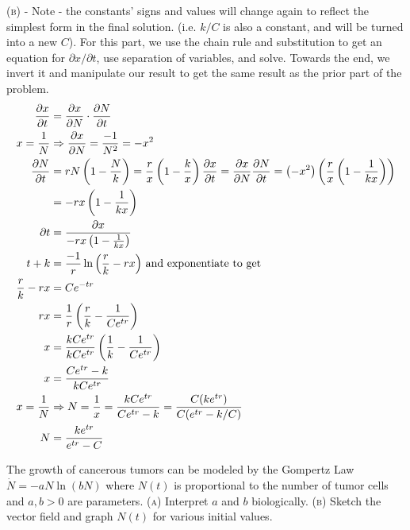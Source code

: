 \documentclass[11pt,answers]{exam}
\begin{document}
\begin{questions}
\begin{solution}
\textsc{(b)} - Note - the constants' signs and values will change again to reflect the simplest form in the final solution. (i.e. $k/C$ is also a constant, and will be turned into a new $C$).  For this part, we use the chain rule and substitution to get an equation for $\partial{x}/\partial{t}$, use separation of variables, and solve.  Towards the end, we invert it and manipulate our result to get the same result as the prior part of the problem.
\begin{align*}
\frac{\partial{x}}{\partial{t}} &= \frac{\partial{x}}{\partial{N}}\cdot\frac{\partial{N}}{\partial{t}} \\
x = \frac{1}{N} &\Rightarrow \frac{\partial{x}}{\partial{N}} = \frac{-1}{N^2} = -x^2\\
\frac{\partial{N}}{\partial{t}} &= rN\left(1 - \frac{N}{k}\right) = \frac{r}{x}\left( 1 - \frac{k}{x} \right)
\frac{\partial{x}}{\partial{t}} = \frac{\partial{x}}{\partial{N}}\frac{\partial{N}}{\partial{t}} = \left(-x^2\right)\left(\frac{r}{x}\left( 1 - \frac{1}{kx}\right)\right) \\
&= -rx \left(1 - \frac{1}{kx}\right) \\
\partial{t} &= \frac{\partial{x}}{-rx \left(1 - \frac{1}{kx}\right)} \\
t + k &= \frac{-1}{r}\ln{\left( \frac{r}{k} - rx \right)} \hbox{ and exponentiate to get} \\
\frac{r}{k} - rx &= Ce^{-tr} \\
rx &= \frac{1}{r}\left( \frac{r}{k} - \frac{1}{Ce^{tr}} \right)\\
x &= \frac{kCe^{tr}}{kCe^{tr}}\left( \frac{1}{k} - \frac{1}{Ce^{tr}} \right)  \\
x &= \frac{Ce^{tr} - k}{kCe^{tr}} \\
x = \frac{1}{N} &\Rightarrow N = \frac{1}{x} = \frac{kCe^{tr}}{Ce^{tr} - k} = \frac{C(ke^{tr})}{C(e^{tr} - k/C)} \\
N &= \frac{ke^{tr}}{e^{tr} - C}
\end{align*}
\end{solution}

\item The growth of cancerous tumors can be modeled by the Gompertz Law $\dot{N} = -aN\ln{(bN)}$ where $N(t)$ is proportional to the number of tumor cells and $a, b > 0$ are parameters.
\newline\textsc{(a)} Interpret $a$ and $b$ biologically.
\newline\textsc{(b)} Sketch the vector field and graph $N(t)$ for various initial values.


\end{questions}
\end{document}
